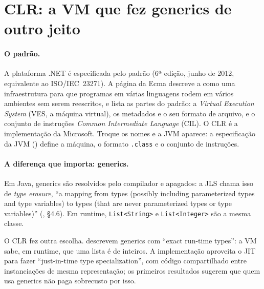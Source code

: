 \section{CLR: a VM que fez generics de outro jeito}
\label{sec:hist-clr}

\paragraph{O padrão.}
A plataforma .NET é especificada pelo padrão
 (6ª edição, junho de 2012, equivalente ao
ISO/IEC~23271). A página da Ecma descreve a
 como uma
infraestrutura para que programas em várias linguagens rodem em vários
ambientes sem serem reescritos, e lista as partes do padrão: a
\emph{Virtual Execution System} (VES, a máquina virtual), os metadados
e o seu formato de arquivo, e o conjunto de instruções
\emph{Common Intermediate Language} (CIL). O CLR é a implementação da
Microsoft. Troque os nomes e a JVM aparece: a especificação da JVM
() define a máquina, o formato \texttt{.class} e o
conjunto de instruções.

\paragraph{A diferença que importa: generics.}
Em Java, generics são resolvidos pelo compilador e apagados: a JLS chama
isso de \emph{type erasure}, \enquote{a mapping from types (possibly
including parameterized types and type variables) to types (that are
never parameterized types or type variables)}
(, §4.6). Em runtime, \texttt{List<String>} e
\texttt{List<Integer>} são a mesma classe.

O CLR fez outra escolha. \textcite{paper:clr-generics} descrevem generics
com \enquote{exact run-time types}: a VM sabe, em runtime, que uma lista
é de inteiros. A implementação aproveita o JIT para fazer
\enquote{just-in-time type specialization}, com código compartilhado
entre instanciações de mesma representação; os primeiros resultados
sugerem que quem usa generics não paga sobrecusto por isso.

